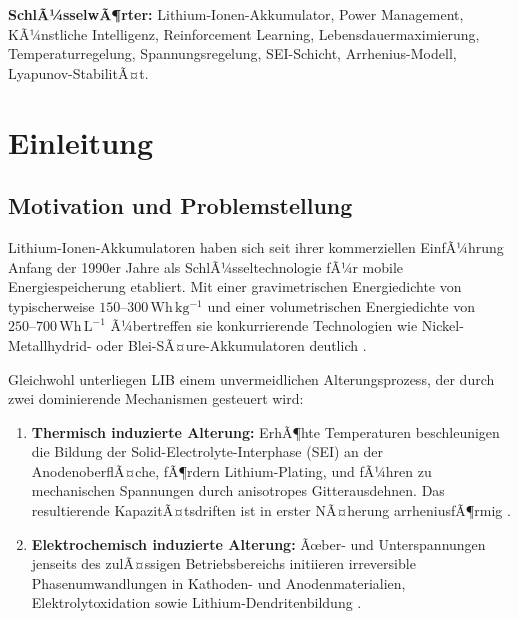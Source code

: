 ﻿\documentclass[12pt,a4paper]{article}
\begin{document}
	\vspace{1cm}
	\noindent\textbf{SchlÃ¼sselwÃ¶rter:} Lithium-Ionen-Akkumulator, Power Management,
	KÃ¼nstliche Intelligenz, Reinforcement Learning, Lebensdauermaximierung,
	Temperaturregelung, Spannungsregelung, SEI-Schicht, Arrhenius-Modell, Lyapunov-StabilitÃ¤t.
	
	\newpage
	\tableofcontents
	\newpage
	
	\section{Einleitung}
	
	\subsection{Motivation und Problemstellung}
	
	Lithium-Ionen-Akkumulatoren haben sich seit ihrer kommerziellen EinfÃ¼hrung Anfang
	der 1990er Jahre als SchlÃ¼sseltechnologie fÃ¼r mobile Energiespeicherung etabliert.
	Mit einer gravimetrischen Energiedichte von typischerweise
	$150\text{--}300\,\mathrm{Wh\,kg^{-1}}$ und einer volumetrischen Energiedichte
	von $250\text{--}700\,\mathrm{Wh\,L^{-1}}$ Ã¼bertreffen sie konkurrierende
	Technologien wie Nickel-Metallhydrid- oder Blei-SÃ¤ure-Akkumulatoren deutlich
	\cite{Tarascon2001}.
	
	Gleichwohl unterliegen LIB einem unvermeidlichen Alterungsprozess, der durch
	zwei dominierende Mechanismen gesteuert wird:
	
	\begin{enumerate}[leftmargin=*, label=(\arabic*)]
		\item \textbf{Thermisch induzierte Alterung:} ErhÃ¶hte Temperaturen beschleunigen
		die Bildung der Solid-Electrolyte-Interphase (SEI) an der AnodenoberflÃ¤che,
		fÃ¶rdern Lithium-Plating, und fÃ¼hren zu mechanischen Spannungen durch
		anisotropes Gitterausdehnen. Das resultierende KapazitÃ¤tsdriften ist
		in erster NÃ¤herung arrheniusfÃ¶rmig \cite{Wang2011}.
		
		\item \textbf{Elektrochemisch induzierte Alterung:} Ãœber- und Unterspannungen
		jenseits des zulÃ¤ssigen Betriebsbereichs initiieren irreversible Phasenumwandlungen
		in Kathoden- und Anodenmaterialien, Elektrolytoxidation sowie Lithium-Dendritenbildung
		\cite{Aurbach2002}.
	\end{enumerate}
	
\end{document}

